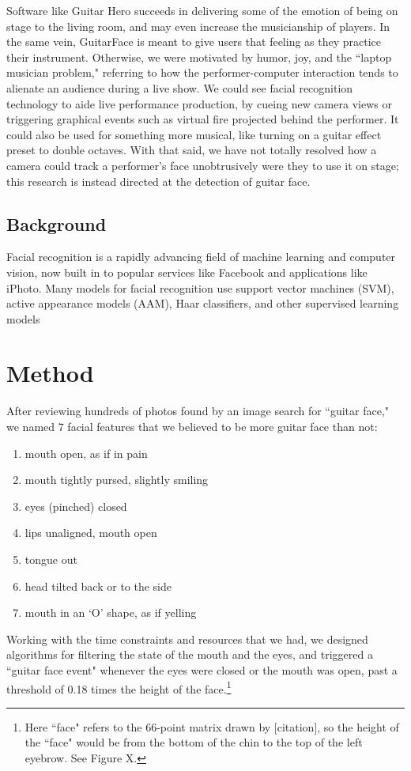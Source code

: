 \documentclass[twocolumn]{article}
\begin{document}
Software like Guitar Hero succeeds in delivering some of the emotion of being on stage to the living room, and may even increase the musicianship of players. In the same vein, GuitarFace is meant to give users that feeling as they practice their instrument. Otherwise, we were motivated by humor, joy, and the ``laptop musician problem," referring to how the performer-computer interaction tends to alienate an audience during a live show. We could see facial recognition technology to aide live performance production, by cueing new camera views or triggering graphical events such as virtual fire projected behind the performer. It could also be used for something more musical, like turning on a guitar effect preset to double octaves. With that said, we have not totally resolved how a camera could track a performer's face unobtrusively were they to use it on stage; this research is instead directed at the detection of guitar face.

\subsection{Background}
Facial recognition is a rapidly advancing field of machine learning and computer vision, now built in to popular services like Facebook and applications like iPhoto. Many models for facial recognition use support vector machines (SVM), active appearance models (AAM), Haar classifiers, and other supervised learning models

\section{Method}
After reviewing hundreds of photos found by an image search for ``guitar face," we named 7 facial features that we believed to be more guitar face than not:
\begin{enumerate}
\item mouth open, as if in pain
\item mouth tightly pursed, slightly smiling
\item eyes (pinched) closed
\item lips unaligned, mouth open
\item tongue out
\item head tilted back or to the side
\item mouth in an `O' shape, as if yelling
\end{enumerate}
Working with the time constraints and resources that we had, we designed algorithms for filtering the state of the mouth and the eyes, and triggered a ``guitar face event" whenever the eyes were closed or the mouth was open, past a threshold of 0.18 times the height of the face.\footnote{Here ``face" refers to the 66-point matrix drawn by [citation], so the height of the ``face" would be from the bottom of the chin to the top of the left eyebrow. See Figure X.}
\end{document}
